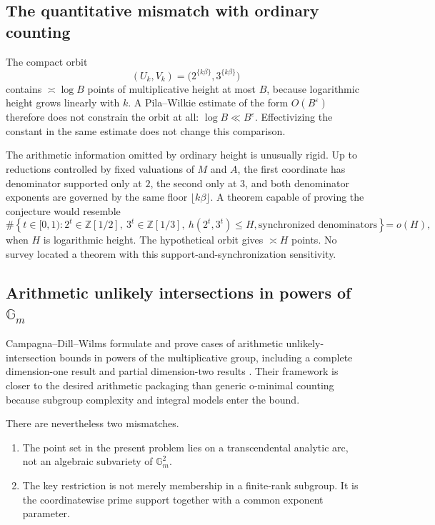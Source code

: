 \documentclass[10pt,letterpaper]{article}
\newcommand{\Z}{\mathbb Z}
\newcommand{\Gm}{\mathbb G_m}
\newcommand{\eps}{\varepsilon}
\begin{document}
\subsection{The quantitative mismatch with ordinary counting}

The compact orbit
\[
  (U_k,V_k)=\bigl(2^{\{k\beta\}},3^{\{k\beta\}}\bigr)
\]
contains \(\asymp\log B\) points of multiplicative height at most \(B\), because logarithmic
height grows linearly with \(k\).  A Pila--Wilkie estimate of the form \(O(B^\eps)\) therefore
does not constrain the orbit at all: \(\log B\ll B^\eps\).  Effectivizing the constant in the
same estimate does not change this comparison.

The arithmetic information omitted by ordinary height is unusually rigid.  Up to reductions
controlled by fixed valuations of \(M\) and \(A\), the first coordinate has denominator
supported only at \(2\), the second only at \(3\), and both denominator exponents are governed
by the same floor \(\lfloor k\beta\rfloor\).  A theorem capable of proving the conjecture
would resemble
\begin{equation}
  \#\left\{
    t\in[0,1):
    2^t\in\Z[1/2],\ 3^t\in\Z[1/3],\
    h(2^t,3^t)\leq H,
    \text{synchronized denominators}
  \right\}=o(H),
  \label{eq:support-count}
\end{equation}
when \(H\) is logarithmic height.  The hypothetical orbit gives \(\asymp H\) points.  No
survey located a theorem with this support-and-synchronization sensitivity.

\subsection{Arithmetic unlikely intersections in powers of \texorpdfstring{\(\Gm\)}{Gm}}

Campagna--Dill--Wilms formulate and prove cases of arithmetic unlikely-intersection bounds in
powers of the multiplicative group, including a complete dimension-one result and partial
dimension-two results \cite{CampagnaDillWilms}.  Their framework is closer to the desired
arithmetic packaging than generic o-minimal counting because subgroup complexity and
integral models enter the bound.

There are nevertheless two mismatches.

\begin{enumerate}
\item The point set in the present problem lies on a transcendental analytic arc, not an
algebraic subvariety of \(\Gm^2\).
\item The key restriction is not merely membership in a finite-rank subgroup.  It is the
coordinatewise prime support together with a common exponent parameter.
\end{enumerate}
\end{document}
